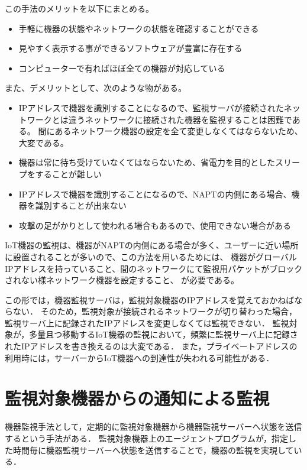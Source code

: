 	この手法のメリットを以下にまとめる。
	\begin{itemize}
		\item 手軽に機器の状態やネットワークの状態を確認することができる
		\item 見やすく表示する事ができるソフトウェアが豊富に存在する
		\item コンピューターで有ればほぼ全ての機器が対応している
	\end{itemize}

	また、デメリットとして、次のような物がある。
	\begin{itemize}
		\item IPアドレスで機器を識別することになるので、監視サーバが接続されたネットワークとは違うネットワークに接続された機器を監視することは困難である。
			間にあるネットワーク機器の設定を全て変更しなくてはならないため、大変である。
		\item 機器は常に待ち受けていなくてはならないため、省電力を目的としたスリープをすることが難しい
		\item IPアドレスで機器を識別することになるので、NAPTの内側にある場合、機器を識別することが出来ない
		\item 攻撃の足がかりとして使われる場合もあるので、使用できない場合がある
	\end{itemize}

	IoT機器の監視は、機器がNAPTの内側にある場合が多く、ユーザーに近い場所に設置されることが多いので、この方法を用いるためには、
	機器がグローバルIPアドレスを持っていること、間のネットワークにて監視用パケットがブロックされない様ネットワーク機器を設定すること、
	が必要である。

	この形では，機器監視サーバは，監視対象機器のIPアドレスを覚えておかねばならない．
	そのため，監視対象が接続されるネットワークが切り替わった場合，監視サーバ上に記録されたIPアドレスを変更しなくては監視できない．
	監視対象が，多量且つ移動するIoT機器の監視において，頻繁に監視サーバ上に記録されたIPアドレスを書き換えるのは大変である．
	また，プライベートアドレスの利用時には，サーバーからIoT機器への到達性が失われる可能性がある．

\section{監視対象機器からの通知による監視}
	機器監視手法として，定期的に監視対象機器から機器監視サーバーへ状態を送信するという手法がある．
	監視対象機器上のエージェントプログラムが，指定した時間毎に機器監視サーバーへ状態を送信することで，機器の監視を実現している．
	\medskip
	
